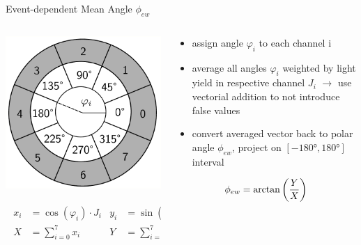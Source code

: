 \documentclass[aspectratio=169]{beamer}
\begin{document}
	\begin{frame}{Event-dependent Mean Angle $\phi_{ew}$}
		\begin{columns}
			
		
			\begin{column}{.5\textwidth}
				\centering
				\includegraphics[width=.5\textwidth]{pictures/phi_channel.pdf}
				
				
				\begin{gather}
					\begin{align*}
						x_{i}& = \cos(\varphi_{i}) \cdot J_{i} 
						& y_{i} &= \sin(\varphi_{i}) \cdot J_{i}\\
						X  &= \sum_{i=0}^{7} x_{i}
						& Y &= \sum_{i=0}^{7} y_{i}\\
					\end{align*}
				\end{gather}
			
				
				
			\end{column}
		
			\begin{column}{.5\textwidth}
				\vspace{-1cm}
				\begin{itemize}
					\item assign angle $\varphi_{i}$ to each channel i
					\item average all angles $\varphi_{i}$ weighted by light yield in respective channel $J_i$ $\rightarrow$ use vectorial addition to not introduce false values
					\item convert averaged vector back to polar angle $\phi_{ew}$, project on $\left[-\ang{180},\ang{180}\right]$ interval
				\end{itemize}
				\begin{align*}
					\label{eq:phiew}
					\phi_{ew} = \arctan\qty(\frac{Y}{X})
				\end{align*}
				
			\end{column}
		
		\end{columns}
	\end{frame}
	
\end{document}

